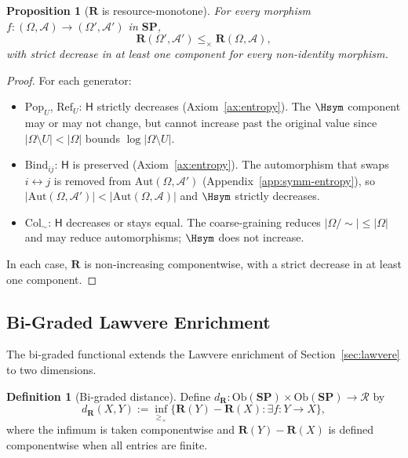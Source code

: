 \documentclass[12pt,a4paper]{article}
\newtheorem{proposition}[theorem]{Proposition}
\theoremstyle{definition}
\newtheorem{definition}[theorem]{Definition}
\theoremstyle{remark}
\newcommand{\Ent}{\ensuremath{\mathsf{H}}}
\newcommand{\SP}{\mathbf{SP}}
\newcommand{\Ob}{\mathrm{Ob}}
\newcommand{\Pop}{\ensuremath{\mathrm{Pop}}}
\newcommand{\RefOp}{\ensuremath{\mathrm{Ref}}}
\newcommand{\Bind}{\ensuremath{\mathrm{Bind}}}
\newcommand{\Col}{\ensuremath{\mathrm{Col}}}
\begin{document}
\begin{proposition}[$\mathbf{R}$ is resource-monotone]
\label{prop:bigraded-mono}
For every morphism $f:(\Omega,\mathcal{A})\to(\Omega',\mathcal{A}')$ in $\SP$,
\[
  \mathbf{R}(\Omega',\mathcal{A}')\le_\times\mathbf{R}(\Omega,\mathcal{A}),
\]
with strict decrease in at least one component for every non-identity morphism.
\end{proposition}

\begin{proof}
For each generator:
\begin{itemize}
  \item $\Pop_U$, $\RefOp_U$: $\Ent$ strictly decreases (Axiom~\ref{ax:entropy}).
    The $\Hsym$ component may or may not change, but cannot increase past the
    original value since $|\Omega\setminus U|<|\Omega|$ bounds $\log|\Omega\setminus U|$.
  \item $\Bind_{ij}$: $\Ent$ is preserved (Axiom~\ref{ax:entropy}). The automorphism
    that swaps $i\leftrightarrow j$ is removed from $\mathrm{Aut}(\Omega,\mathcal{A}')$
    (Appendix~\ref{app:symm-entropy}), so $|\mathrm{Aut}(\Omega,\mathcal{A}')|<
    |\mathrm{Aut}(\Omega,\mathcal{A})|$ and $\Hsym$ strictly decreases.
  \item $\Col_\sim$: $\Ent$ decreases or stays equal. The coarse-graining reduces
    $|\Omega/{\sim}|\le|\Omega|$ and may reduce automorphisms; $\Hsym$ does not
    increase.
\end{itemize}
In each case, $\mathbf{R}$ is non-increasing componentwise, with a strict decrease
in at least one component.
\end{proof}

\subsection{Bi-Graded Lawvere Enrichment}

The bi-graded functional extends the Lawvere enrichment of Section~\ref{sec:lawvere}
to two dimensions.

\begin{definition}[Bi-graded distance]
\label{def:bigraded-dist}
Define $d_{\mathbf{R}}:\Ob(\SP)\times\Ob(\SP)\to\mathcal{R}$ by
\[
  d_{\mathbf{R}}(X,Y)
  :=\inf_{\ge_\times}\bigl\{\mathbf{R}(Y)-\mathbf{R}(X):\exists f:Y\to X\bigr\},
\]
where the infimum is taken componentwise and $\mathbf{R}(Y)-\mathbf{R}(X)$ is
defined componentwise when all entries are finite.
\end{definition}
\end{document}
